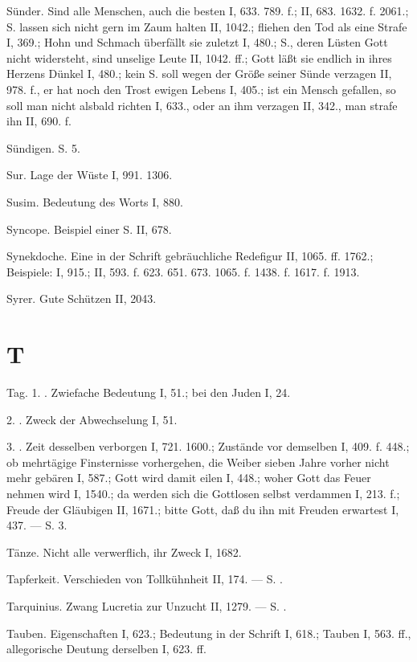 Sünder. Sind alle Menschen, auch die besten I, 633. 789. f.; II, 683. 1632. f. 2061.; S. lassen sich nicht gern im Zaum halten II, 1042.; fliehen den Tod als eine Strafe I, 369.; Hohn und Schmach überfällt sie zuletzt I, 480.; S., deren Lüsten Gott nicht widersteht, sind unselige Leute II, 1042. ff.; Gott läßt sie endlich in ihres Herzens Dünkel I, 480.; kein S. soll wegen der Größe seiner Sünde verzagen II, 978. f., er hat noch den Trost ewigen Lebens I, 405.; ist ein Mensch gefallen, so soll man nicht alsbald richten I, 633., oder an ihm verzagen II, 342., man strafe ihn II, 690. f.

Sündigen. S.  5.

Sur. Lage der Wüste I, 991. 1306.

Susim. Bedeutung des Worts I, 880.

Syncope. Beispiel einer S. II, 678.

Synekdoche. Eine in der Schrift gebräuchliche Redefigur II, 1065. ff. 1762.; Beispiele: I, 915.; II, 593. f. 623. 651. 673. 1065. f. 1438. f. 1617. f. 1913.

Syrer. Gute Schützen II, 2043.

\section{T}

Tag. 1. . Zwiefache Bedeutung I, 51.; bei den Juden I, 24.

2. . Zweck der Abwechselung I, 51.

3. . Zeit desselben verborgen I, 721. 1600.; Zustände vor demselben I, 409. f. 448.; ob mehrtägige Finsternisse vorhergehen, die Weiber sieben Jahre vorher nicht mehr gebären I, 587.; Gott wird damit eilen I, 448.; woher Gott das Feuer nehmen wird I, 1540.; da werden sich die Gottlosen selbst verdammen I, 213. f.; Freude der Gläubigen II, 1671.; bitte Gott, daß du ihn mit Freuden erwartest I, 437. — S.  3.

Tänze. Nicht alle verwerflich, ihr Zweck I, 1682.

Tapferkeit. Verschieden von Tollkühnheit II, 174. — S. .

Tarquinius. Zwang Lucretia zur Unzucht II, 1279. — S. .

Tauben. Eigenschaften I, 623.; Bedeutung in der Schrift I, 618.;  Tauben I, 563. ff., allegorische Deutung derselben I, 623. ff.

